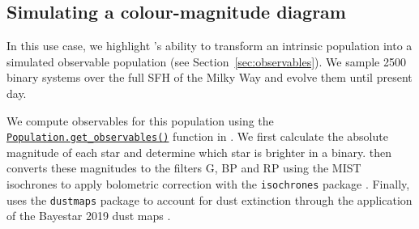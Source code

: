 \documentclass[twocolumn, twocolappendix, oneside]{aastex631}
\newcommand{\codestyle}[1]{{\color{codecolour} \texttt{#1}}}
\begin{document}
\subsection{Simulating a \gaia colour-magnitude diagram}

In this use case, we highlight \cogsworth's ability to transform an intrinsic population into a simulated observable population (see Section~\ref{sec:observables}). We sample 2500 binary systems over the full SFH of the Milky Way and evolve them until present day.

We compute observables for this population using the \href{https://cogsworth.readthedocs.io/en/latest/api/cogsworth.pop.Population.html#cogsworth.pop.Population.get_observables}{\codestyle{Population.get\_observables()}} function in \cogsworth. We first calculate the absolute magnitude of each star and determine which star is brighter in a binary. \cogsworth then converts these magnitudes to the \gaia filters G, BP and RP using the MIST isochrones to apply bolometric correction with the \texttt{isochrones} package \citep{Morton+2015:2015ascl.soft03010M, Dotter+2016, Choi+2016:2016ApJ...823..102C, Paxton2011, Paxton2013, Paxton2015}. Finally, \cogsworth uses the \texttt{dustmaps} package to account for dust extinction through the application of the Bayestar 2019 dust maps \citep{2018JOSS....3..695M, Bayestar}.
\end{document}

